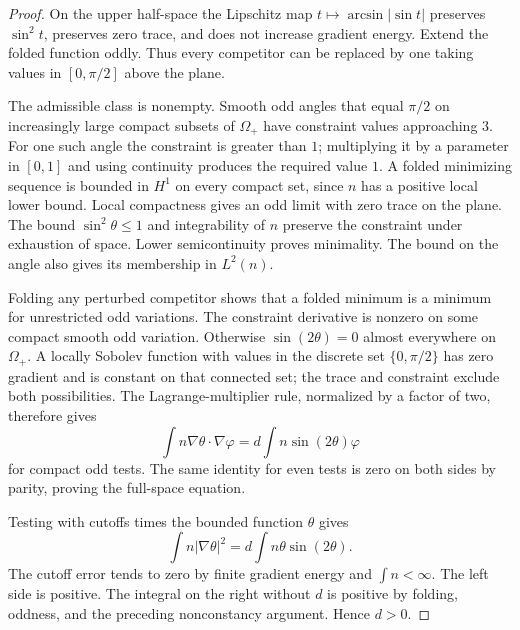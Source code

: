 \begin{proof}
On the upper half-space the Lipschitz map
\(t\mapsto\arcsin|\sin t|\) preserves \(\sin^2t\), preserves zero
trace, and does not increase gradient energy.  Extend the folded
function oddly.  Thus every competitor can be replaced by one taking
values in \([0,\pi/2]\) above the plane.

The admissible class is nonempty.  Smooth odd angles that equal
\(\pi/2\) on increasingly large compact subsets of \(\Omega_+\)
have constraint values approaching \(3\).  For one such angle the
constraint is greater than \(1\); multiplying it by a parameter in
\([0,1]\) and using continuity produces the required value \(1\).
A folded minimizing sequence is bounded in \(H^1\) on every compact
set, since \(n\) has a positive local lower bound.  Local compactness
gives an odd limit with zero trace on the plane.  The bound
\(\sin^2\theta\le1\) and integrability of \(n\) preserve the constraint
under exhaustion of space.  Lower semicontinuity proves minimality.
The bound on the angle also gives its membership in \(L^2(n)\).

Folding any perturbed competitor shows that a folded minimum is a
minimum for unrestricted odd variations.  The constraint derivative
is nonzero on some compact smooth odd variation.  Otherwise
\(\sin(2\theta)=0\) almost everywhere on \(\Omega_+\).
A locally Sobolev function with values in the discrete set
\(\{0,\pi/2\}\) has zero gradient and is constant on that connected
set; the trace and constraint exclude both possibilities.
The Lagrange-multiplier rule, normalized by a factor of two, therefore
gives
\[
 \int n\nabla\theta\cdot\nabla\varphi
       =d\int n\sin(2\theta)\varphi
\]
for compact odd tests.  The same identity for even tests is zero on
both sides by parity, proving the full-space equation.

Testing with cutoffs times the bounded function \(\theta\) gives
\begin{equation}\label{eq:angle-positive-multiplier}
 \int n|\nabla\theta|^2
       =d\int n\theta\sin(2\theta).
\end{equation}
The cutoff error tends to zero by finite gradient energy and
\(\int n<\infty\).  The left side is positive.  The integral on the
right without \(d\) is positive by folding, oddness, and the preceding
nonconstancy argument.  Hence \(d>0\).


\end{proof}
